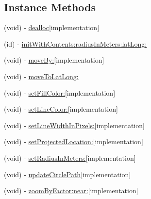 \subsection*{Instance Methods}
\begin{DoxyCompactItemize}
\item 
(void) -\/ \hyperlink{interface_r_m_circle_acf8d3d162dee4f97d0c15932c8573bd1}{dealloc}{\ttfamily  \mbox{[}implementation\mbox{]}}
\item 
(id) -\/ \hyperlink{interface_r_m_circle_a0ec54a4b9dbdf85741f80d294e799d90}{init\-With\-Contents\-:radius\-In\-Meters\-:lat\-Long\-:}
\item 
(void) -\/ \hyperlink{interface_r_m_circle_ae75b2ad3001e194c07a13b53a2486871}{move\-By\-:}{\ttfamily  \mbox{[}implementation\mbox{]}}
\item 
(void) -\/ \hyperlink{interface_r_m_circle_a3499f453b9a9a25bc7c30419b35c7008}{move\-To\-Lat\-Long\-:}
\item 
(void) -\/ \hyperlink{interface_r_m_circle_a3fb94dae8c970736b643cf5293a55410}{set\-Fill\-Color\-:}{\ttfamily  \mbox{[}implementation\mbox{]}}
\item 
(void) -\/ \hyperlink{interface_r_m_circle_a8b50f3b1671b6de854aae4b49639120a}{set\-Line\-Color\-:}{\ttfamily  \mbox{[}implementation\mbox{]}}
\item 
(void) -\/ \hyperlink{interface_r_m_circle_a06cdb4f00d047443d030eafb63890c84}{set\-Line\-Width\-In\-Pixels\-:}{\ttfamily  \mbox{[}implementation\mbox{]}}
\item 
(void) -\/ \hyperlink{interface_r_m_circle_ac25b00f51cc70e84cad0c769df5e8a03}{set\-Projected\-Location\-:}{\ttfamily  \mbox{[}implementation\mbox{]}}
\item 
(void) -\/ \hyperlink{interface_r_m_circle_a7f2e47cbb3ad9b09db6cd705b4d8e070}{set\-Radius\-In\-Meters\-:}{\ttfamily  \mbox{[}implementation\mbox{]}}
\item 
(void) -\/ \hyperlink{interface_r_m_circle_a4dddcad3626f86cc77687e2465c212c8}{update\-Circle\-Path}{\ttfamily  \mbox{[}implementation\mbox{]}}
\item 
(void) -\/ \hyperlink{interface_r_m_circle_ad1cd9f88068ff39d6000f2bf9816cc2b}{zoom\-By\-Factor\-:near\-:}{\ttfamily  \mbox{[}implementation\mbox{]}}
\end{DoxyCompactItemize}

